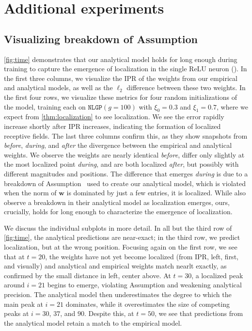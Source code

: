 \section{Additional experiments}

\subsection{Visualizing breakdown of Assumption~}

\cref{fig:time} demonstrates that our analytical model holds for long enough during training to capture the emergence of localization in the single ReLU neuron (). 
In the first three columns, we visualize the IPR of the weights from our empirical and analytical models, as well as the $\ell_2$ difference between these two weights.
In the first four rows, we visualize these metrics for four random initializations of the model, training each on $\texttt{NLGP}(g=100)$ with $\xi_0 = 0.3$ and $\xi_1 = 0.7$, where we expect from \cref{thm:localization} to see localization. 
We see the error rapidly increase shortly after IPR increases, indicating the formation of localized receptive fields.
The last three columns confirm this, as they show snapshots from \emph{before}, \emph{during}, and \emph{after} the divergence between the empirical and analytical weights.
We observe the weights are nearly identical \emph{before}, differ only slightly at the most localized point \emph{during}, and are both localized \emph{after}, but possibly with different magnitudes and positions.
The difference that emerges \emph{during} is due to a breakdown of Assumption~ used to create our analytical model, which is violated when the norm of $\mathbf{w}$ is dominated by just a few entries, \ie it is localized.
While \cite{ingrosso2022data} also observe a breakdown in their analytical model as localization emerges, ours, crucially, holds for long enough to characterize the emergence of localization.

We discuss the individual subplots in more detail.
In all but the third row of \cref{fig:time}, the analytical predictions are near-exact; in the third row, we predict localization, but at the wrong position.
Focusing again on the first row, we see that at $t=20$, the weights have not yet become localized (from IPR, left, first, and visually) and analytical and empirical weights match nearlt exactly, as confirmed by the small distance in left, center above. 
At $t=30$, a localized peak around $i=21$ begins to emerge, violating Assumption  and weakening analytical precision.
The analytical model then underestimates the degree to which the main peak at $i=21$ dominates, while it overestimates the size of competing peaks at $i=30$, $37$, and $90$. 
Despite this, at $t=50$, we see that predictions from the analytical model retain a match to the empirical model. 

